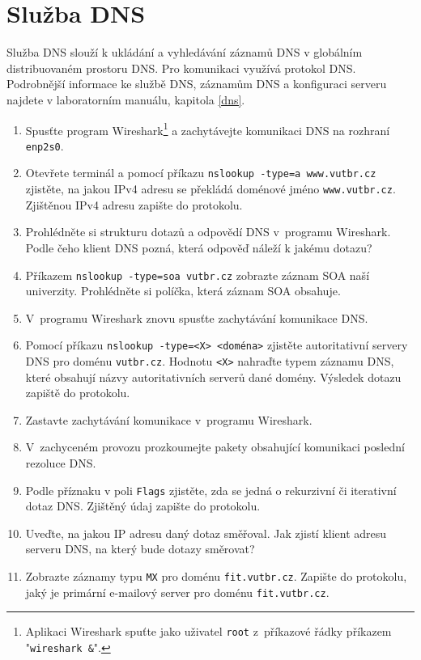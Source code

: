 \documentclass[a4paper,11pt]{article}
\begin{document}
\section{Služba DNS}
Služba DNS slouží k ukládání a vyhledávání záznamů DNS v globálním distribuovaném prostoru DNS. Pro komunikaci využívá protokol DNS. Podrobnější informace ke službě DNS, záznamům DNS a konfiguraci serveru najdete v laboratorním manuálu, kapitola \ref{dns}. 
\begin{enumerate}
    \item Spusťte program Wireshark\footnote{Aplikaci Wireshark spuťte jako uživatel \texttt{root} z~příkazové řádky příkazem "\texttt{wireshark \&}".} a zachytávejte komunikaci DNS na rozhraní \texttt{enp2s0}.
    \item Otevřete terminál a pomocí příkazu \texttt{nslookup -type=a www.vutbr.cz} zjistěte, na jakou IPv4 adresu se překládá doménové jméno \texttt{www.vutbr.cz}. Zjištěnou IPv4 adresu zapište do protokolu.
    \item Prohlédněte si strukturu dotazů a odpovědí DNS v~programu Wireshark. Podle čeho klient DNS pozná, která odpověď náleží k jakému dotazu? 
    \item Příkazem \texttt{nslookup -type=soa vutbr.cz} zobrazte záznam SOA naší univerzity. Prohlédněte si políčka, která záznam SOA obsahuje. 
    \item V~programu Wireshark znovu spusťte zachytávání komunikace DNS.
    \item Pomocí příkazu \texttt{nslookup -type=<X> <doména>} zjistěte autoritativní servery DNS pro doménu \texttt{vutbr.cz}. Hodnotu \texttt{<X>} nahraďte typem záznamu DNS, které obsahují názvy autoritativních serverů dané domény. Výsledek dotazu zapiště do protokolu.
    \item Zastavte zachytávání komunikace v~programu Wireshark.
    \item V~zachyceném provozu prozkoumejte pakety obsahující komunikaci poslední rezoluce DNS.
    \item Podle příznaku v poli {\tt Flags} zjistěte, zda se jedná o rekurzivní či iterativní dotaz DNS. Zjištěný údaj zapište do protokolu.
    \item Uveďte, na jakou IP adresu daný dotaz směřoval. Jak zjistí klient adresu serveru DNS, na který bude dotazy směrovat?    \item Zobrazte záznamy typu \texttt{MX} pro doménu \texttt{fit.vutbr.cz}. Zapište do protokolu, jaký je primární e-mailový server pro doménu \texttt{fit.vutbr.cz}.
\end{enumerate}
\end{document}
